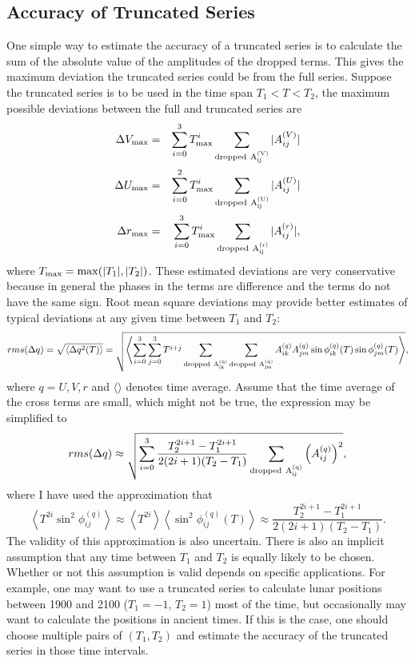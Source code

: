 \documentclass[12pt]{article}
\newcommand \beq {\begin{equation}}
\newcommand \eeq {\end{equation}}
\newcommand \beqn {\begin{eqnarray}}
\newcommand \eeqn {\end{eqnarray}}
\begin{document}
\subsection{Accuracy of Truncated Series}

One simple way to estimate the accuracy of a truncated series is to calculate the 
sum of the absolute value of the amplitudes of the dropped terms. This gives the 
maximum deviation the truncated series could be from the full series. Suppose the 
truncated series is to be used in the time span $T_1 < T < T_2$, the maximum possible 
deviations between the full and truncated series are
\beqn
  \Delta V_{\rm max} &=& \sum_{i=0}^3 T_{\rm max}^i \sum_{\rm dropped~{A_{ij}^{(V)}}} |A_{ij}^{(V)}| \label{eq:DeltaVmax} \\
  \Delta U_{\rm max} &=& \sum_{i=0}^2 T_{\rm max}^i \sum_{\rm dropped~{A_{ij}^{(U)}}} |A_{ij}^{(U)}| \label{eq:DeltaUmax} \\
  \Delta r_{\rm max} &=& \sum_{i=0}^3 T_{\rm max}^i \sum_{\rm dropped~{A_{ij}^{(r)}}} |A_{ij}^{(r)}| , \label{eq:Deltarmax}
\eeqn
where $T_{\rm max} = {\rm max}(|T_1|, |T_2|)$. These estimated deviations are 
very conservative because 
in general the phases in the terms are difference and the terms do not have the same sign. 
Root mean square deviations may provide better estimates of typical deviations at any 
given time between $T_1$ and $T_2$: 
\beq
 rms(\Delta q) = \sqrt{ \langle \Delta q^2(T) \rangle}  = \sqrt{ \left\langle \sum_{i=0}^3 \sum_{j=0}^3 T^{i+j} 
\sum_{\rm dropped~{A_{ik}^{(q)}}} \sum_{\rm dropped~{A_{jm}^{(q)}}} 
A_{ik}^{(q)} A_{jm}^{(q)} \sin \phi_{ik}^{(q)}(T) \sin \phi_{jm}^{(q)}(T) \right\rangle } ,
\eeq
where $q=U,V,r$ and $\langle \rangle$ denotes time average. Assume that the time 
average of the cross terms are small, which might not be true, the expression 
may be simplified to 
\beq
  rms(\Delta q) \approx \sqrt{ \sum_{i=0}^3 \frac{T_2^{2i+1}-T_1^{2i+1}}{2(2i+1)(T_2-T_1)} 
\sum_{\rm dropped~{A_{ij}^{(q)}}} \left( A_{ij}^{(q)}\right)^2 } ,
\label{eq:rmsDeltaq}
\eeq
where I have used the approximation that 
\beq
  \left\langle T^{2i} \sin^2 \phi_{ij}^{(q)} \right\rangle \approx 
\left\langle T^{2i}  \right\rangle \left\langle \sin^2 \phi_{ij}^{(q)}(T) \right\rangle 
\approx \frac{T_2^{2i+1}-T_1^{2i+1}}{2(2i+1)(T_2-T_1)} .
\eeq
The validity of this approximation is also uncertain. There is also an implicit  
assumption that any time between $T_1$ and $T_2$ is equally likely to be chosen. 
Whether or not this assumption is valid depends on specific applications. For example, one 
may want to use a truncated series to calculate lunar positions between 1900 and 2100 
($T_1=-1$, $T_2=1$)
most of the time, but occasionally may want to calculate the positions in ancient times. 
If this is the case, one should choose multiple pairs of $(T_1, T_2)$ and 
estimate the accuracy of the truncated series in those time intervals.
\end{document}
